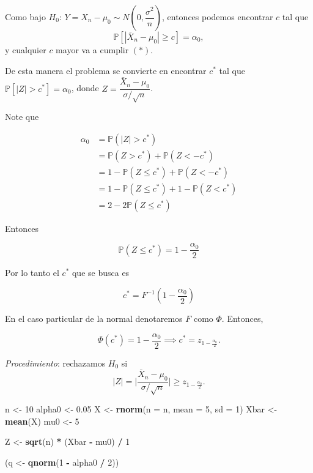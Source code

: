 \documentclass[
  12pt,
]{book}
\newenvironment{Shaded}{\begin{snugshade}}{\end{snugshade}}
\newcommand{\DataTypeTok}[1]{\textcolor[rgb]{0.13,0.29,0.53}{#1}}
\newcommand{\DecValTok}[1]{\textcolor[rgb]{0.00,0.00,0.81}{#1}}
\newcommand{\FloatTok}[1]{\textcolor[rgb]{0.00,0.00,0.81}{#1}}
\newcommand{\KeywordTok}[1]{\textcolor[rgb]{0.13,0.29,0.53}{\textbf{#1}}}
\newcommand{\NormalTok}[1]{#1}
\newcommand{\OperatorTok}[1]{\textcolor[rgb]{0.81,0.36,0.00}{\textbf{#1}}}
\newcommand{\StringTok}[1]{\textcolor[rgb]{0.31,0.60,0.02}{#1}}
\begin{document}
Como bajo \(H_0\): \(Y = X_n-\mu_0 \sim N\left(0,\dfrac{\sigma^2}{n}\right)\),
entonces podemos encontrar \(c\) tal que \[\mathbb P[|\bar X_n-\mu_0|\geq c] =
\alpha_0,\] y cualquier \(c\) mayor va a cumplir \((*)\).

De esta manera el problema se convierte en encontrar \(c^*\) tal que \(\mathbb P[|Z|>c^*] = \alpha_0\), donde \(Z = \dfrac{\bar X_n - \mu_0}{\sigma/\sqrt n}\).

Note que

\begin{align*}
\alpha_0 
&= \mathbb{P}(|Z|>c ^{*}) \\
&=  \mathbb{P}(Z >c ^{*}) + \mathbb{P}(Z < -c ^{*}) \\ 
&=  1- \mathbb{P}(Z \leq c ^{*}) + \mathbb{P}(Z < -c ^{*}) \\ 
&=  1- \mathbb{P}(Z \leq c ^{*}) +  1 - \mathbb{P}(Z < c ^{*}) \\ 
&=  2 - 2 \mathbb{P}(Z \leq c ^{*})  
\end{align*}

Entonces

\begin{equation*}
\mathbb{P}(Z \leq c ^{*}) = 1- \dfrac{\alpha_0}{2}
\end{equation*}

Por lo tanto el \(c ^{*}\) que se busca es

\begin{equation*}
c^* = F^{-1}\left(1- \dfrac{\alpha_0}{2}\right)
\end{equation*}

En el caso particular de la normal denotaremos \(F\) como \(\Phi\). Entonces,

\[\Phi(c^*) = 1 - \dfrac{\alpha_0}2 \implies c^* = z_{1-\frac{\alpha_0}2}.\]

\emph{Procedimiento}: rechazamos \(H_0\) si \[|Z| = \bigg| \dfrac{\bar
X_n-\mu_0}{\sigma/\sqrt n}\bigg| \geq z_{1-\frac{\alpha_0}2}.\]

\begin{Shaded}
\begin{Highlighting}[]
\NormalTok{n \textless{}{-}}\StringTok{ }\DecValTok{10}
\NormalTok{alpha0 \textless{}{-}}\StringTok{ }\FloatTok{0.05}
\NormalTok{X \textless{}{-}}\StringTok{ }\KeywordTok{rnorm}\NormalTok{(}\DataTypeTok{n =}\NormalTok{ n, }\DataTypeTok{mean =} \DecValTok{5}\NormalTok{, }\DataTypeTok{sd =} \DecValTok{1}\NormalTok{)}
\NormalTok{Xbar \textless{}{-}}\StringTok{ }\KeywordTok{mean}\NormalTok{(X)}
\NormalTok{mu0 \textless{}{-}}\StringTok{ }\DecValTok{5}

\NormalTok{Z \textless{}{-}}\StringTok{ }\KeywordTok{sqrt}\NormalTok{(n) }\OperatorTok{*}\StringTok{ }\NormalTok{(Xbar }\OperatorTok{{-}}\StringTok{ }\NormalTok{mu0) }\OperatorTok{/}\StringTok{ }\DecValTok{1}

\NormalTok{(q \textless{}{-}}\StringTok{ }\KeywordTok{qnorm}\NormalTok{(}\DecValTok{1} \OperatorTok{{-}}\StringTok{ }\NormalTok{alpha0 }\OperatorTok{/}\StringTok{ }\DecValTok{2}\NormalTok{))}
\end{Highlighting}
\end{Shaded}
\end{document}
